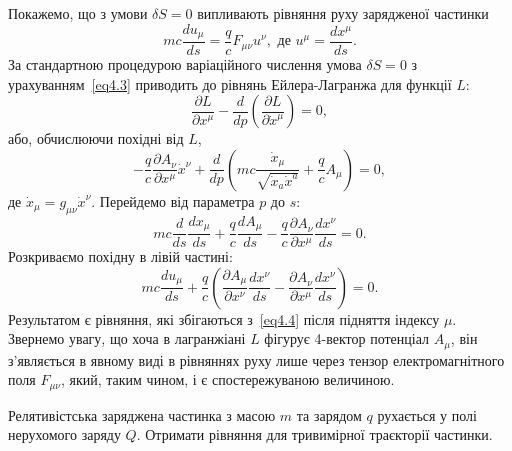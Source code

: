 Покажемо, що з умови $\delta S = 0$ випливають рівняння руху зарядженої частинки
\begin{equation}\label{eq4.4}
mc \frac{du_\mu}{ds} = \frac{q}{c} F_{\mu\nu} u^\nu, \text{ де } u^\mu = \frac{dx^\mu}{ds}.
\end{equation}
За стандартною процедурою варіаційного числення умова $\delta S = 0$ з урахуванням~\eqref{eq4.3} приводить до рівнянь Ейлера-Лагранжа для функції $L$:
\begin{equation*}
\frac{\partial L}{\partial x^\mu} - \frac{d}{dp} \left( \frac{\partial L}{\partial \dot{x}^\mu} \right) = 0,
\end{equation*}
або, обчислюючи похідні від $L$,
\begin{equation*}
-\frac{q}{c} \frac{\partial A_\nu}{\partial x^\mu} \dot{x}^\nu + \frac{d}{dp} \left( mc \frac{\dot{x}_\mu}{\sqrt{\dot{x}_a \dot{x}^a}} + \frac{q}{c} A_\mu \right) = 0,
\end{equation*}
де $\dot{x}_\mu = g_{\mu\nu} \dot{x}^\nu$. Перейдемо від параметра $p$ до $s$:
\begin{equation*}
mc \frac{d}{ds} \frac{dx_\mu}{ds} + \frac{q}{c} \frac{d A_\mu}{ds} - \frac{q}{c} \frac{\partial A_\nu}{\partial x^\mu} \frac{dx^\nu}{ds} = 0.
\end{equation*}
Розкриваємо похідну в лівій частині:
\begin{equation*}
mc \frac{du_\mu}{ds} + \frac{q}{c} \left( \frac{\partial A_\mu}{\partial x^\nu} \frac{dx^\nu}{ds} - \frac{\partial A_\nu}{\partial x^\mu} \frac{dx^\nu}{ds} \right) = 0.
\end{equation*}
Результатом є рівняння, які збігаються з~\eqref{eq4.4} після підняття індексу $\mu$. Звернемо увагу, що хоча в лагранжіані $L$ фігурує 4-вектор потенціал $A_\mu$, він з'являється в явному виді в рівняннях руху лише через тензор електромагнітного поля $F_{\mu\nu}$, який, таким чином, і є спостережуваною величиною.

\begin{problem}
Релятивістська заряджена частинка з масою $m$ та зарядом $q$ рухається у полі нерухомого заряду $Q$. Отримати рівняння для тривимірної траєкторії частинки.
\end{problem}

